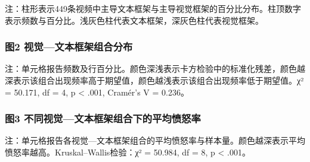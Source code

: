 \documentclass[
]{article}
\begin{document}
注：柱形表示449条视频中主导文本框架与主导视觉框架的百分比分布。柱顶数字表示频数与百分比。浅灰色柱代表文本框架，深灰色柱代表视觉框架。

\subsubsection{图2
视觉---文本框架组合分布}\label{ux56fe2-ux89c6ux89c9ux6587ux672cux6846ux67b6ux7ec4ux5408ux5206ux5e03}

注：单元格报告频数及行百分比。颜色深浅表示卡方检验中的标准化残差，颜色越深表示该组合出现频率高于期望值，颜色越浅表示该组合出现频率低于期望值。χ²
= 50.171, df = 4, p \textless{} .001, Cramér's V = 0.236。

\subsubsection{图3
不同视觉---文本框架组合下的平均愤怒率}\label{ux56fe3-ux4e0dux540cux89c6ux89c9ux6587ux672cux6846ux67b6ux7ec4ux5408ux4e0bux7684ux5e73ux5747ux6124ux6012ux7387}

注：单元格报告各视觉---文本框架组合的平均愤怒率与样本量。颜色越深表示平均愤怒率越高。Kruskal--Wallis检验：χ²
= 50.984, df = 8, p \textless{} .001。
\end{document}
